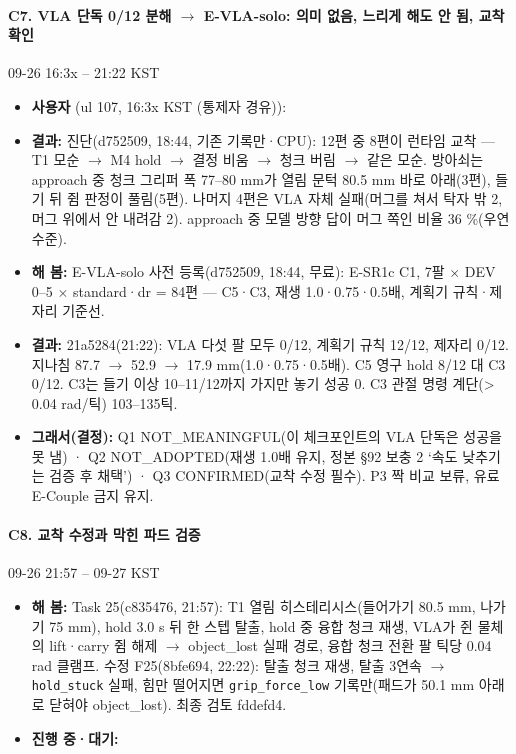 \paragraph{C7. VLA 단독 0/12 분해 $\rightarrow$ E-VLA-solo: 의미 없음, 느리게 해도 안 됨, 교착 확인}
{\small 09-26 16:3x -- 21:22 KST}
\begin{itemize}
  \item \textbf{사용자} (ul 107, 16:3x KST (통제자 경유)): 
  \item \textbf{결과:} 진단(d752509, 18:44, 기존 기록만·CPU): 12편 중 8편이 런타임 교착 --- T1 모순 $\rightarrow$ M4 hold $\rightarrow$ 결정 비움 $\rightarrow$ 청크 버림 $\rightarrow$ 같은 모순. 방아쇠는 approach 중 청크 그리퍼 폭 77--80 mm가 열림 문턱 80.5 mm 바로 아래(3편), 들기 뒤 쥠 판정이 풀림(5편). 나머지 4편은 VLA 자체 실패(머그를 쳐서 탁자 밖 2, 머그 위에서 안 내려감 2). approach 중 모델 방향 답이 머그 쪽인 비율 36 \%(우연 수준).
  \item \textbf{해 봄:} E-VLA-solo 사전 등록(d752509, 18:44, 무료): E-SR1c C1, 7팔 $\times$ DEV 0--5 $\times$ standard·dr = 84편 --- C5·C3, 재생 1.0·0.75·0.5배, 계획기 규칙·제자리 기준선.
  \item \textbf{결과:} 21a5284(21:22): VLA 다섯 팔 모두 0/12, 계획기 규칙 12/12, 제자리 0/12. 지나침 87.7 $\rightarrow$ 52.9 $\rightarrow$ 17.9 mm(1.0·0.75·0.5배). C5 영구 hold 8/12 대 C3 0/12. C3는 들기 이상 10--11/12까지 가지만 놓기 성공 0. C3 관절 명령 계단(> 0.04 rad/틱) 103--135틱.
  \item \textbf{그래서(결정):} Q1 NOT\_MEANINGFUL(이 체크포인트의 VLA 단독은 성공을 못 냄) · Q2 NOT\_ADOPTED(재생 1.0배 유지, 정본 §92 보충 2 `속도 낮추기는 검증 후 채택') · Q3 CONFIRMED(교착 수정 필수). P3 짝 비교 보류, 유료 E-Couple 금지 유지.
\end{itemize}

\paragraph{C8. 교착 수정과 막힌 파드 검증}
{\small 09-26 21:57 -- 09-27 KST}
\begin{itemize}
  \item \textbf{해 봄:} Task 25(c835476, 21:57): T1 열림 히스테리시스(들어가기 80.5 mm, 나가기 75 mm), hold 3.0 s 뒤 한 스텝 탈출, hold 중 융합 청크 재생, VLA가 쥔 물체의 lift·carry 쥠 해제 $\rightarrow$ object\_lost 실패 경로, 융합 청크 전환 팔 틱당 0.04 rad 클램프. 수정 F25(8bfe694, 22:22): 탈출 청크 재생, 탈출 3연속 $\rightarrow$ \texttt{hold\_\allowbreak{}stuck} 실패, 힘만 떨어지면 \texttt{grip\_\allowbreak{}force\_\allowbreak{}low} 기록만(패드가 50.1 mm 아래로 닫혀야 object\_lost). 최종 검토 fddefd4.
  \item \textbf{진행 중·대기:} 
\end{itemize}

